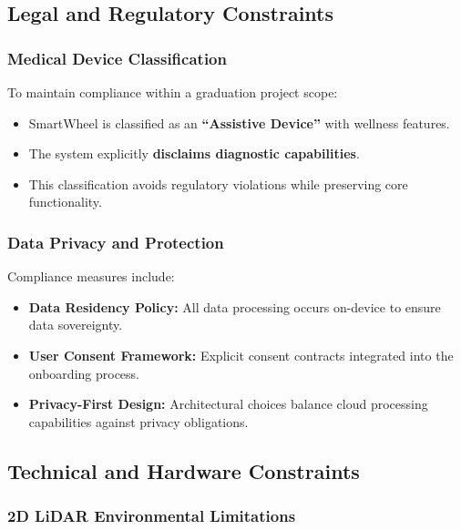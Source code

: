 \documentclass[12pt,a4paper]{report}
\begin{document}
\subsection{Legal and Regulatory Constraints}

\subsubsection{Medical Device Classification}

To maintain compliance within a graduation project scope:
\begin{itemize}
    \item SmartWheel is classified as an \textbf{``Assistive Device''} with wellness features.
    \item The system explicitly \textbf{disclaims diagnostic capabilities}.
    \item This classification avoids regulatory violations while preserving core functionality.
\end{itemize}

\subsubsection{Data Privacy and Protection}

Compliance measures include:
\begin{itemize}
    \item \textbf{Data Residency Policy:} All data processing occurs on-device to ensure data sovereignty.
    \item \textbf{User Consent Framework:} Explicit consent contracts integrated into the onboarding process.
    \item \textbf{Privacy-First Design:} Architectural choices balance cloud processing capabilities against privacy obligations.
\end{itemize}

\subsection{Technical and Hardware Constraints}

\subsubsection{2D LiDAR Environmental Limitations}
\end{document}
